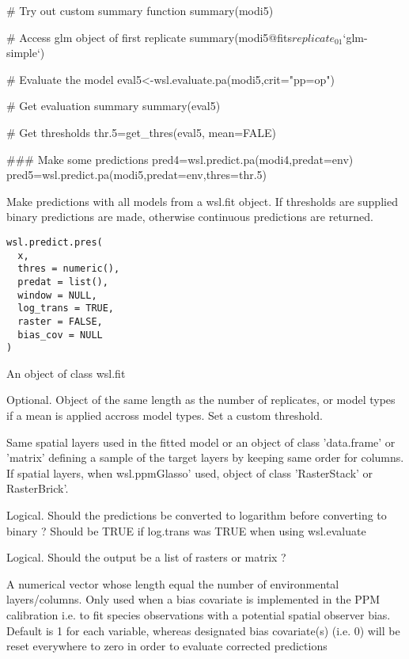 \documentclass[a4paper]{book}
\begin{document}
\begin{Examples}
\begin{ExampleCode}
# Try out custom summary function
summary(modi5)

# Access glm object of first replicate
summary(modi5@fits$replicate_01$`glm-simple`)

# Evaluate the model
eval5<-wsl.evaluate.pa(modi5,crit="pp=op")

# Get evaluation summary
summary(eval5)

# Get thresholds
thr.5=get_thres(eval5, mean=FALE)

### Make some predictions
pred4=wsl.predict.pa(modi4,predat=env)
pred5=wsl.predict.pa(modi5,predat=env,thres=thr.5)

\end{ExampleCode}
\end{Examples}
%
\begin{Description}\relax
Make predictions with all models from a wsl.fit object. If thresholds are supplied
binary predictions are made, otherwise continuous predictions are returned.
\end{Description}
%
\begin{Usage}
\begin{verbatim}
wsl.predict.pres(
  x,
  thres = numeric(),
  predat = list(),
  window = NULL,
  log_trans = TRUE,
  raster = FALSE,
  bias_cov = NULL
)
\end{verbatim}
\end{Usage}
%
\begin{Arguments}
\begin{ldescription}
\item[\code{x}] An object of class wsl.fit

\item[\code{thres}] Optional. Object of the same length as the number of replicates, or model
types if a mean is applied accross model types. Set a custom threshold.

\item[\code{predat}] Same spatial layers used in the fitted model or an object of class 'data.frame' or 
'matrix' defining a sample of the target layers by keeping same order for columns. If spatial layers,
when wsl.ppmGlasso' used, object of class 'RasterStack' or RasterBrick'.

\item[\code{log\_trans}] Logical. Should the predictions be converted to logarithm before converting to binary ?
Should be TRUE if log.trans was TRUE when using wsl.evaluate

\item[\code{raster}] Logical. Should the output be a list of rasters or matrix ?

\item[\code{bias\_cov}] A numerical vector whose length equal the number of environmental layers/columns.
Only used when a bias covariate is implemented in the PPM calibration i.e. to fit species observations with
a potential spatial observer bias. Default is 1 for each variable, whereas designated bias covariate(s)
(i.e. 0) will be reset everywhere to zero in order to evaluate corrected predictions
\end{ldescription}
\end{Arguments}
\end{document}
